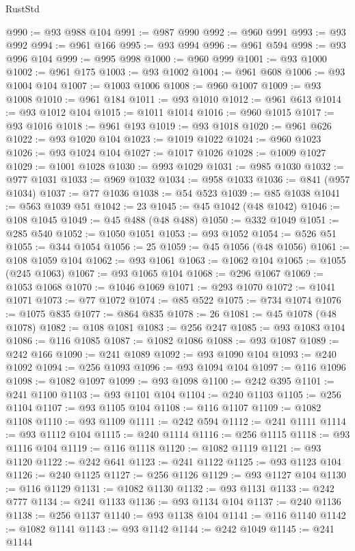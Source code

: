 \begin{lexlean}{RustStd}
\begin{coremodule}
@990 := @93 @988 @104
@991 := @987 @990
@992 := @960 @991
@993 := @93 @992
@994 := @961 @166
@995 := @93 @994
@996 := @961 @594
@998 := @93 @996 @104
@999 := @995 @998
@1000 := @960 @999
@1001 := @93 @1000
@1002 := @961 @175
@1003 := @93 @1002
@1004 := @961 @608
@1006 := @93 @1004 @104
@1007 := @1003 @1006
@1008 := @960 @1007
@1009 := @93 @1008
@1010 := @961 @184
@1011 := @93 @1010
@1012 := @961 @613
@1014 := @93 @1012 @104
@1015 := @1011 @1014
@1016 := @960 @1015
@1017 := @93 @1016
@1018 := @961 @193
@1019 := @93 @1018
@1020 := @961 @626
@1022 := @93 @1020 @104
@1023 := @1019 @1022
@1024 := @960 @1023
@1026 := @93 @1024 @104
@1027 := @1017 @1026
@1028 := @1009 @1027
@1029 := @1001 @1028
@1030 := @993 @1029
@1031 := @985 @1030
@1032 := @977 @1031
@1033 := @969 @1032
@1034 := @958 @1033
@1036 := @841 (@957 @1034)
@1037 := @77 @1036
@1038 := @54 @523
@1039 := @85 @1038
@1041 := @563 @1039 @51
@1042 := 23
@1045 := @45 @1042 (@48 @1042)
@1046 := @108 @1045
@1049 := @45 @488 (@48 @488)
@1050 := @332 @1049
@1051 := @285 @540
@1052 := @1050 @1051
@1053 := @93 @1052
@1054 := @526 @51
@1055 := @344 @1054
@1056 := 25
@1059 := @45 @1056 (@48 @1056)
@1061 := @108 @1059 @104
@1062 := @93 @1061
@1063 := @1062 @104
@1065 := @1055 (@245 @1063)
@1067 := @93 @1065 @104
@1068 := @296 @1067
@1069 := @1053 @1068
@1070 := @1046 @1069
@1071 := @293 @1070
@1072 := @1041 @1071
@1073 := @77 @1072
@1074 := @85 @522
@1075 := @734 @1074
@1076 := @1075 @835
@1077 := @864 @835
@1078 := 26
@1081 := @45 @1078 (@48 @1078)
@1082 := @108 @1081
@1083 := @256 @247
@1085 := @93 @1083 @104
@1086 := @116 @1085
@1087 := @1082 @1086
@1088 := @93 @1087
@1089 := @242 @166
@1090 := @241 @1089
@1092 := @93 @1090 @104
@1093 := @240 @1092
@1094 := @256 @1093
@1096 := @93 @1094 @104
@1097 := @116 @1096
@1098 := @1082 @1097
@1099 := @93 @1098
@1100 := @242 @395
@1101 := @241 @1100
@1103 := @93 @1101 @104
@1104 := @240 @1103
@1105 := @256 @1104
@1107 := @93 @1105 @104
@1108 := @116 @1107
@1109 := @1082 @1108
@1110 := @93 @1109
@1111 := @242 @594
@1112 := @241 @1111
@1114 := @93 @1112 @104
@1115 := @240 @1114
@1116 := @256 @1115
@1118 := @93 @1116 @104
@1119 := @116 @1118
@1120 := @1082 @1119
@1121 := @93 @1120
@1122 := @242 @641
@1123 := @241 @1122
@1125 := @93 @1123 @104
@1126 := @240 @1125
@1127 := @256 @1126
@1129 := @93 @1127 @104
@1130 := @116 @1129
@1131 := @1082 @1130
@1132 := @93 @1131
@1133 := @242 @777
@1134 := @241 @1133
@1136 := @93 @1134 @104
@1137 := @240 @1136
@1138 := @256 @1137
@1140 := @93 @1138 @104
@1141 := @116 @1140
@1142 := @1082 @1141
@1143 := @93 @1142
@1144 := @242 @1049
@1145 := @241 @1144

\end{coremodule}
\end{lexlean}
